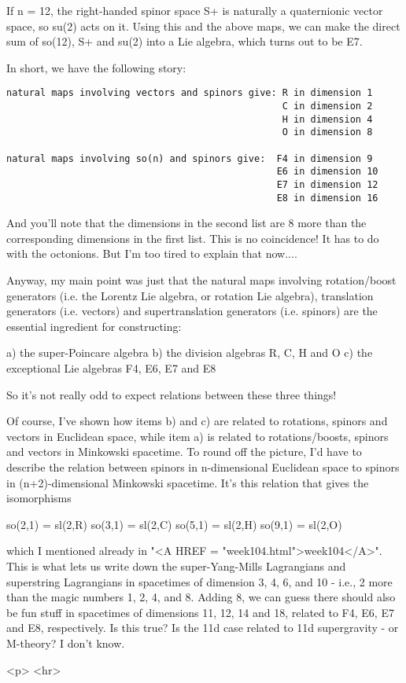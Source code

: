 If n = 12, the right-handed spinor space S+ is naturally a quaternionic
vector space, so su(2) acts on it.  Using this and the above maps, we
can make the direct sum of so(12), S+ and su(2) into a Lie algebra, which
turns out to be E7.

In short, we have the following story:

\begin{verbatim}
natural maps involving vectors and spinors give: R in dimension 1
                                                 C in dimension 2
                                                 H in dimension 4
                                                 O in dimension 8

natural maps involving so(n) and spinors give:  F4 in dimension 9
                                                E6 in dimension 10
                                                E7 in dimension 12
                                                E8 in dimension 16
\end{verbatim}
    
And you'll note that the dimensions in the second list are 8 more than
the corresponding dimensions in the first list.  This is no coincidence!
It has to do with the octonions.  But I'm too tired to explain that now....

Anyway, my main point was just that the natural maps involving 
rotation/boost generators (i.e. the Lorentz Lie algebra, or rotation Lie
algebra), translation generators (i.e. vectors) and supertranslation
generators (i.e. spinors) are the essential ingredient for constructing:

a) the super-Poincare algebra
b) the division algebras R, C, H and O
c) the exceptional Lie algebras F4, E6, E7 and E8

So it's not really odd to expect relations between these three things!

Of course, I've shown how items b) and c) are related to rotations,
spinors and vectors in Euclidean space, while item a) is related to
rotations/boosts, spinors and vectors in Minkowski spacetime.  To round
off the picture, I'd have to describe the relation between spinors in 
n-dimensional Euclidean space to spinors in (n+2)-dimensional Minkowski
spacetime.  It's this relation that gives the isomorphisms

so(2,1) = sl(2,R)
so(3,1) = sl(2,C)
so(5,1) = sl(2,H)
so(9,1) = sl(2,O)

which I mentioned already in "<A HREF =
"week104.html">week104</A>".  This is what lets us write down the
super-Yang-Mills Lagrangians and superstring Lagrangians in spacetimes
of dimension 3, 4, 6, and 10 - i.e., 2 more than the magic numbers 1, 2,
4, and 8.  Adding 8, we can guess there should also be fun stuff in
spacetimes of dimensions 11, 12, 14 and 18, related to F4, E6, E7 and
E8, respectively.  Is this true?  Is the 11d case related to 11d
supergravity - or M-theory?  I don't know.




<p> <hr>




